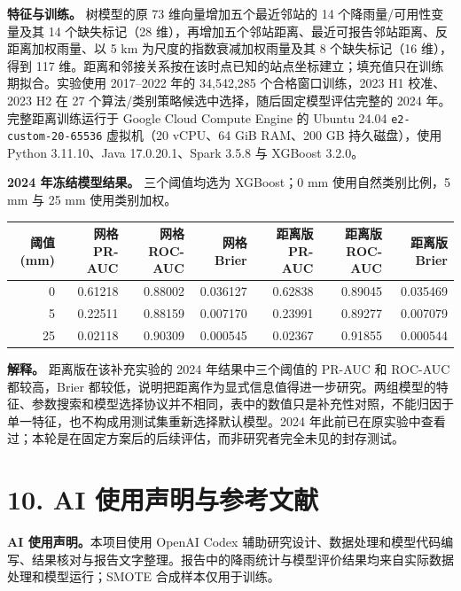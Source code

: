 \documentclass[UTF8,fontset=fandol,10pt,a4paper,landscape]{ctexart}
\begin{document}
\textbf{特征与训练。} 树模型的原 73 维向量增加五个最近邻站的 14 个降雨量/可用性变量及其 14 个缺失标记（28 维），再增加五个邻站距离、最近可报告邻站距离、反距离加权雨量、以 5 km 为尺度的指数衰减加权雨量及其 8 个缺失标记（16 维），得到 117 维。距离和邻接关系按在该时点已知的站点坐标建立；填充值只在训练期拟合。实验使用 2017--2022 年的 34,542,285 个合格窗口训练，2023 H1 校准、2023 H2 在 27 个算法/类别策略候选中选择，随后固定模型评估完整的 2024 年。完整距离训练运行于 Google Cloud Compute Engine 的 Ubuntu 24.04 \texttt{e2-custom-20-65536} 虚拟机（20 vCPU、64 GiB RAM、200 GB 持久磁盘），使用 Python 3.11.10、Java 17.0.20.1、Spark 3.5.8 与 XGBoost 3.2.0。

\textbf{2024 年冻结模型结果。} 三个阈值均选为 XGBoost；0 mm 使用自然类别比例，5 mm 与 25 mm 使用类别加权。

\begin{center}\small
\begin{tabular}{r|rrr|rrr}\toprule
阈值 (mm) & 网格 PR-AUC & 网格 ROC-AUC & 网格 Brier & 距离版 PR-AUC & 距离版 ROC-AUC & 距离版 Brier\\\midrule
0 & 0.61218 & 0.88002 & 0.036127 & 0.62838 & 0.89045 & 0.035469\\
5 & 0.22511 & 0.88159 & 0.007170 & 0.23991 & 0.89277 & 0.007079\\
25 & 0.02118 & 0.90309 & 0.000545 & 0.02367 & 0.91855 & 0.000544\\
\bottomrule\end{tabular}
\end{center}

\textbf{解释。} 距离版在该补充实验的 2024 年结果中三个阈值的 PR-AUC 和 ROC-AUC 都较高，Brier 都较低，说明把距离作为显式信息值得进一步研究。两组模型的特征、参数搜索和模型选择协议并不相同，表中的数值只是补充性对照，不能归因于单一特征，也不构成用测试集重新选择默认模型。2024 年此前已在原实验中查看过；本轮是在固定方案后的后续评估，而非研究者完全未见的封存测试。
\clearpage\section*{10. AI 使用声明与参考文献}

\textbf{AI 使用声明。}本项目使用 OpenAI Codex 辅助研究设计、数据处理和模型代码编写、结果核对与报告文字整理。报告中的降雨统计与模型评价结果均来自实际数据处理和模型运行；SMOTE 合成样本仅用于训练。
\end{document}
